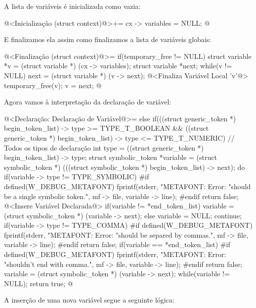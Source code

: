 A lista de variáveis é inicializada como vazia:

\iniciocodigo
@<Inicialização (struct context)@>+=
cx -> variables = NULL;
@
\fimcodigo

E finalizamos ela assim como finalizamos a lista de variáveis globais:

\iniciocodigo
@<Finalização (struct context)@>=
if(temporary_free != NULL){
  struct variable *v = (struct variable *) (cx -> variables);
  struct variable *next;
  while(v != NULL){
    next = (struct variable *) (v -> next);
    @<Finaliza Variável Local 'v'@>
    temporary_free(v);
    v = next;
  }
}
@
\fimcodigo

Agora vamos à interpretação da declaração de variável:

\iniciocodigo
@<Declaração: Declaração de Variável@>=
else if(((struct generic_token *) begin_token_list) -> type >=
        TYPE_T_BOOLEAN &&
        ((struct generic_token *) begin_token_list) -> type <=
        TYPE_T_NUMERIC){ // Todos os tipos de declaração
  int type = ((struct generic_token *) begin_token_list) -> type;
  struct symbolic_token *variable = (struct symbolic_token *)
           (((struct symbolic_token *) begin_token_list) -> next);
  do{
    if(variable -> type != TYPE_SYMBOLIC){
#if defined(W_DEBUG_METAFONT)
      fprintf(stderr, "METAFONT: Error: %
                    "should be a single symbolic token.\n", mf -> file,
                    variable -> line);
#endif
      return false;
    }
    @<Insere Variável Declarada@>
    if(variable != *end_token_list)
      variable = (struct symbolic_token *) (variable -> next);
    else{
      variable = NULL;
      continue;
    }
    if(variable -> type != TYPE_COMMA){
#if defined(W_DEBUG_METAFONT)
      fprintf(stderr, "METAFONT: Error: %
                    "should be separed by commas.\n", mf -> file,
                    variable -> line);
#endif
      return false;
    }
    if(variable == *end_token_list){
#if defined(W_DEBUG_METAFONT)
      fprintf(stderr, "METAFONT: Error: %
                    "shouldn't end with comma.\n", mf -> file,
                    variable -> line);
#endif
      return false;
    }
    variable = (struct symbolic_token *) (variable -> next);
  } while(variable != NULL);
  return true;
}
@
\fimcodigo

A inserção de uma nova variável segue a seguinte lógica:

